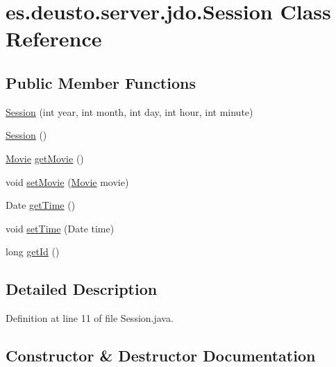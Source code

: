 \hypertarget{classes_1_1deusto_1_1server_1_1jdo_1_1_session}{}\section{es.\+deusto.\+server.\+jdo.\+Session Class Reference}
\label{classes_1_1deusto_1_1server_1_1jdo_1_1_session}
\subsection*{Public Member Functions}
\begin{DoxyCompactItemize}
\item 
\mbox{\hyperlink{classes_1_1deusto_1_1server_1_1jdo_1_1_session_acebd495eed4a395e55f12dc62463d4c7}{Session}} (int year, int month, int day, int hour, int minute)
\item 
\mbox{\hyperlink{classes_1_1deusto_1_1server_1_1jdo_1_1_session_aa32b7ce43993267c4b8567c8134b5c31}{Session}} ()
\item 
\mbox{\hyperlink{classes_1_1deusto_1_1server_1_1jdo_1_1_movie}{Movie}} \mbox{\hyperlink{classes_1_1deusto_1_1server_1_1jdo_1_1_session_afdae557964a51e2d6b037db206b344c1}{get\+Movie}} ()
\item 
void \mbox{\hyperlink{classes_1_1deusto_1_1server_1_1jdo_1_1_session_ae4e58ddc0ec278e4f16eba20755b5ceb}{set\+Movie}} (\mbox{\hyperlink{classes_1_1deusto_1_1server_1_1jdo_1_1_movie}{Movie}} movie)
\item 
Date \mbox{\hyperlink{classes_1_1deusto_1_1server_1_1jdo_1_1_session_aa2855c0e0f810bc64c6c84fbfab2f977}{get\+Time}} ()
\item 
void \mbox{\hyperlink{classes_1_1deusto_1_1server_1_1jdo_1_1_session_a24a0fb018aaa31864d30260cfadfc1f0}{set\+Time}} (Date time)
\item 
long \mbox{\hyperlink{classes_1_1deusto_1_1server_1_1jdo_1_1_session_ade2b7eec9ef10a4c733aa3f4b18a8fe3}{get\+Id}} ()
\end{DoxyCompactItemize}


\subsection{Detailed Description}


Definition at line 11 of file Session.\+java.



\subsection{Constructor \& Destructor Documentation}
\mbox{\label{classes_1_1deusto_1_1server_1_1jdo_1_1_session_acebd495eed4a395e55f12dc62463d4c7}} 
